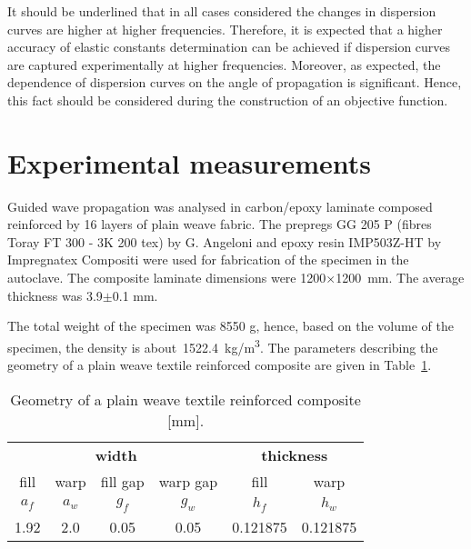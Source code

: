 \documentclass[preprint,12pt]{elsarticle}
\begin{document}
It should be underlined that in all cases considered the changes in dispersion curves are higher at higher frequencies. Therefore, it is expected that a higher accuracy of elastic constants determination can be achieved if dispersion curves are captured experimentally at higher frequencies. Moreover, as expected, the dependence of dispersion curves on the angle of propagation is significant. Hence, this fact should be considered during the construction of an objective function.
\section{Experimental measurements \label{sec:experiment}}
Guided wave propagation was analysed in carbon/epoxy laminate composed reinforced by 16 layers of plain weave fabric. The prepregs GG 205  P (fibres Toray FT 300 - 3K 200 tex) by G. Angeloni and epoxy resin IMP503Z-HT by Impregnatex Compositi were used for fabrication of the specimen in the autoclave. The composite laminate dimensions were 1200$\times$1200~mm. The average thickness was 3.9$\pm$0.1 mm. 

The total weight of the specimen was 8550 g, hence, based on the volume of the specimen, the density is about~1522.4~kg/m\textsuperscript{3}.
The parameters describing the geometry of a plain weave textile reinforced composite are given in Table~\ref{tab:weave_geo}. 
 \begin{table}[h]
	\renewcommand{\arraystretch}{1.3}
	\centering \footnotesize
	\caption{Geometry of a plain weave textile reinforced composite [mm].}
	\begin{tabular}{cccccc} 
		\toprule
		\multicolumn{4}{c}{\textbf{width} }	& \multicolumn{2}{c}{\textbf{thickness} }  \\ 
	    \cmidrule(lr){1-4} \cmidrule(lr){5-6} 
		fill & warp & fill gap& warp gap& fill & warp\\
		$a_f$ &$a_w$& $g_f$  & $g_w$  & $h_f$& $h_w$ \\ 
		\cmidrule(lr){1-2} \cmidrule(lr){3-4} \cmidrule(lr){5-6}
		1.92 &2.0& 0.05& 0.05 & 0.121875 & 0.121875 \\
		\bottomrule 
	\end{tabular} 
	\label{tab:weave_geo}
\end{table}
\end{document}
